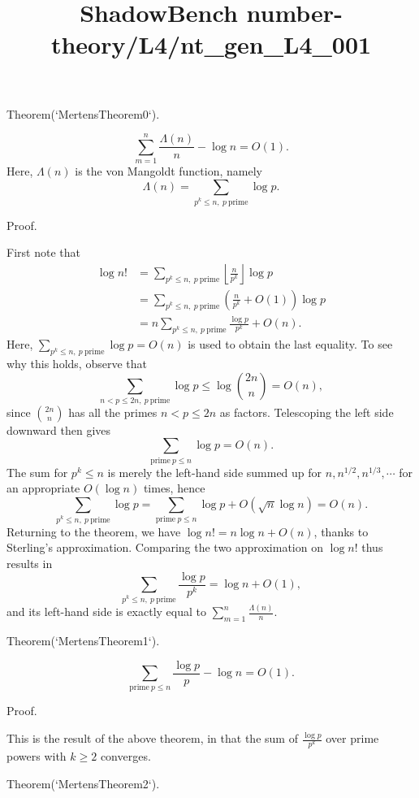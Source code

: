 \documentclass{article}
\title{ShadowBench number-theory/L4/nt\_gen\_L4\_001}
\begin{document}
\maketitle

Theorem(`MertensTheorem0`).

$$
\sum_{m = 1}^n \frac{\Lambda(n)}{n} - \log n = O(1).
$$
Here, $\Lambda(n)$ is the von Mangoldt function, namely
$$
\Lambda(n) = \sum_{p^k \le n,\ p\ \textrm{prime}} \log p.
$$

Proof.

First note that
$$
\begin{align*}
\log n! &= \sum_{p^k \le n,\ p\ \textrm{prime}} \left\lfloor \frac{n}{p^k} \right\rfloor \log p \\
&= \sum_{p^k \le n,\ p\ \textrm{prime}} \left( \frac{n}{p^k} + O(1) \right) \log p \\
&= n \sum_{p^k \le n,\ p\ \textrm{prime}} \frac{\log p}{p^k} + O(n).
\end{align*}
$$
Here, $\sum_{p^k \le n,\ p\ \textrm{prime}} \log p = O(n)$ is used to obtain the last equality. To see why this holds, observe that
$$
\sum_{n < p \le 2n,\ p\ \textrm{prime}} \log p \le \log \binom{2n}{n} = O(n),
$$
since $\binom{2n}{n}$ has all the primes $n < p \le 2n$ as factors. Telescoping the left side downward then gives
$$
\sum_{\textrm{prime}\ p \le n} \log p = O(n).
$$
The sum for $p^k \le n$ is merely the left-hand side summed up for $n, n^{1/2}, n^{1/3}, \cdots$ for an appropriate $O(\log n)$ times, hence
$$
\sum_{p^k \le n,\ p\ \textrm{prime}} \log p = \sum_{\textrm{prime}\ p \le n} \log p  + O(\sqrt{n} \log n) = O(n).
$$
Returning to the theorem, we have $\log n! = n \log n + O(n)$, thanks to Sterling's approximation. Comparing the two approximation on $\log n!$ thus results in
$$
\sum_{p^k \le n,\ p\ \textrm{prime}} \frac{\log p}{p^k} = \log n + O(1),
$$
and its left-hand side is exactly equal to $\sum_{m = 1}^n \frac{\Lambda(n)}{n}$.

Theorem(`MertensTheorem1`).

$$
\sum_{\textrm{prime}\ p \le n} \frac{\log p}{p} - \log n = O(1).
$$

Proof.

This is the result of the above theorem, in that the sum of $\frac{\log p}{p^k}$ over prime powers with $k \ge 2$ converges.

Theorem(`MertensTheorem2`).
\end{document}
